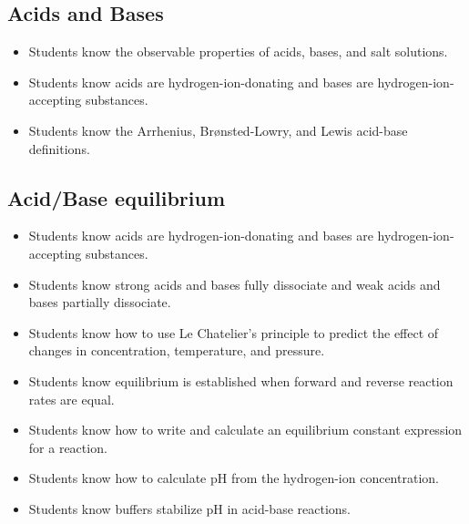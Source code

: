 \documentclass[11pt]{article}
\begin{document}
\subsection{Acids and Bases}
\label{sec:org429bce6}
\begin{itemize}
\item Students know the observable properties of acids, bases, and salt solutions.
\item Students know acids are hydrogen-ion-donating and bases are hydrogen-ion-accepting substances.
\item Students know the Arrhenius, Brønsted-Lowry, and Lewis acid-base definitions.
\end{itemize}
\subsection{Acid/Base equilibrium}
\label{sec:org72a04a5}
\begin{itemize}
\item Students know acids are hydrogen-ion-donating and bases are hydrogen-ion-accepting substances.
\item Students know strong acids and bases fully dissociate and weak acids and bases partially dissociate.
\item Students know how to use Le Chatelier's principle to predict the effect of changes in concentration, temperature, and pressure.
\item Students know equilibrium is established when forward and reverse reaction rates are equal.
\item Students know how to write and calculate an equilibrium constant expression for a reaction.
\item Students know how to calculate pH from the hydrogen-ion concentration.
\item Students know buffers stabilize pH in acid-base reactions.
\end{itemize}
\end{document}
